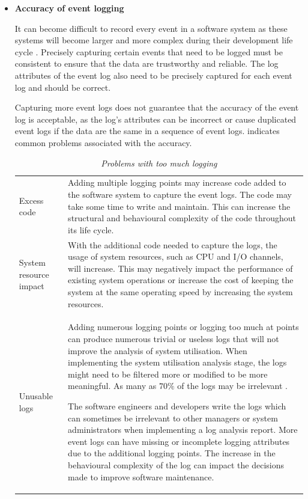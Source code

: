 \begin{itemize}
	\item \textbf{Accuracy of event logging}\par It can become difficult to record every event in a software system as these systems will become larger and more complex during their development life cycle \cite{Stojanov2017}. Precisely capturing certain events that need to be logged must be consistent to ensure that the data are trustworthy and reliable. The log attributes of the event log also need to be precisely captured for each event log and should be correct.\par Capturing more event logs does not guarantee that the accuracy of the event log is acceptable, as the log's attributes can be incorrect or cause duplicated event logs if the data are the same in a sequence of event logs.  indicates common problems associated with the accuracy.

	\begin{table}[!htb]
		\centering
		\caption[Problems with too much logging]
		{\textit{Problems with too much logging \cite{Zhu2015}}}
		\label{tbl:ch1_loggingTooMuch}
		\begin{tabularx}{\linewidth}{p{3cm}X}
			\toprule 
			\thead{Problem}  & \thead{Description} \\
			\midrule

			\rowcolor{lightgray}
			Excess code & Adding multiple logging points may increase code added to the software system to capture the event logs. The code may take some time to write and maintain. This can increase the structural and behavioural complexity of the code throughout its life cycle. \\

			System resource impact & With the additional code needed to capture the logs, the usage of system resources, such as CPU and I/O channels, will increase. This may negatively impact the performance of existing system operations or increase the cost of keeping the system at the same operating speed by increasing the system resources.\\

			\rowcolor{lightgray}
			Unusable logs & Adding numerous logging points or logging too much at points can produce numerous trivial or useless logs that will not improve the analysis of system utilisation. When implementing the system utilisation analysis stage, the logs might need to be filtered more or modified to be more meaningful. As many as $70\%$ of the logs may be irrelevant \cite{Fedaghi2010}. \par The software engineers and developers write the logs which can sometimes be irrelevant to other managers or system administrators when implementing a log analysis report. More event logs can have missing or incomplete logging attributes due to the additional logging points. The increase in the behavioural complexity of the log can impact the decisions made to improve software maintenance. \\
			\bottomrule
		\end{tabularx}
	\end{table}


\end{itemize}
